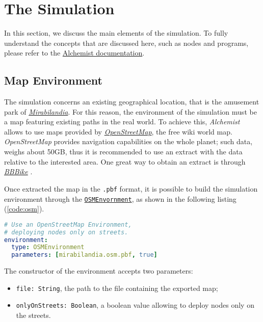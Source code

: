 \section{The Simulation}

In this section, we discuss the main elements of the simulation. To fully understand the concepts that are discussed here, such as nodes and programs, please refer to the \href{https://alchemistsimulator.github.io/}{Alchemist documentation}.

\subsection{Map Environment}
The simulation concerns an existing geographical location, that is the amusement park of \href{https://www.mirabilandia.it/}{\textit{Mirabilandia}}. For this reason, the environment of the simulation must be a map featuring existing paths in the real world. To achieve this, \textit{Alchemist} allows to use maps provided by \href{https://www.openstreetmap.org/}{\textit{OpenStreetMap}}, the free wiki world map. \textit{OpenStreetMap} provides navigation capabilities on the whole planet; such data, weighs about 50GB, thus it is recommended to use an extract with the data relative to the interested area. One great way to obtain an extract is through \href{https://extract.bbbike.org/}{\textit{BBBike}} \cite{Pianini_2013}.

Once extracted the map in the \texttt{.pbf} format, it is possible to build the simulation environment through the \href{https://alchemistsimulator.github.io/reference/kdoc/alchemist/it.unibo.alchemist.model.implementations.environments/-o-s-m-environment/}{\texttt{OSMEnvornment}}, as shown in the following listing (\ref{code:osm}).

\begin{lstlisting}[language=yaml, label=code:osm, caption=Building an \textit{OpenStreetMap} environment.]
# Use an OpenStreetMap Environment,
# deploying nodes only on streets.
environment:
  type: OSMEnvironment
  parameters: [mirabilandia.osm.pbf, true]
\end{lstlisting}

\noindent
The constructor of the environment accepts two parameters:
\begin{itemize}
    \item \texttt{file: String}, the path to the file containing the exported map;
    \item \texttt{onlyOnStreets: Boolean}, a boolean value allowing to deploy nodes only on the streets.
\end{itemize}

